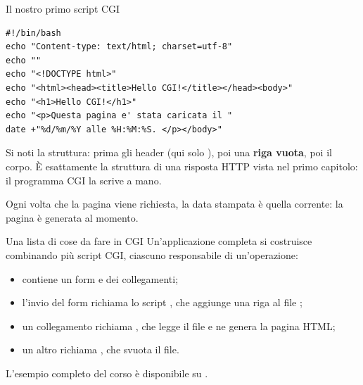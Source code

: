 \begin{esempio}{Il nostro primo script CGI}
\begin{lstlisting}[style=shell, name=hello.cgi]
#!/bin/bash
echo "Content-type: text/html; charset=utf-8"
echo ""
echo "<!DOCTYPE html>"
echo "<html><head><title>Hello CGI!</title></head><body>"
echo "<h1>Hello CGI!</h1>"
echo "<p>Questa pagina e' stata caricata il "
date +"%d/%m/%Y alle %H:%M:%S. </p></body>"
\end{lstlisting}

Si noti la struttura: prima gli header (qui solo ), poi una
\textbf{riga vuota}, poi il corpo. È esattamente la struttura di una risposta
HTTP vista nel primo capitolo: il programma CGI la scrive a mano.

Ogni volta che la pagina viene richiesta, la data stampata è quella corrente:
la pagina è generata al momento.
\end{esempio}

\begin{esempio}{Una lista di cose da fare in CGI}
Un'applicazione completa si costruisce combinando più script CGI, ciascuno
responsabile di un'operazione:

\begin{itemize}
  \item {} contiene un form e dei collegamenti;
  \item l'invio del form richiama lo script , che aggiunge una
        riga al file ;
  \item un collegamento richiama , che legge il file e ne
        genera la pagina HTML;
  \item un altro richiama , che svuota il file.
\end{itemize}

L'esempio completo del corso è disponibile su
.
\end{esempio}


